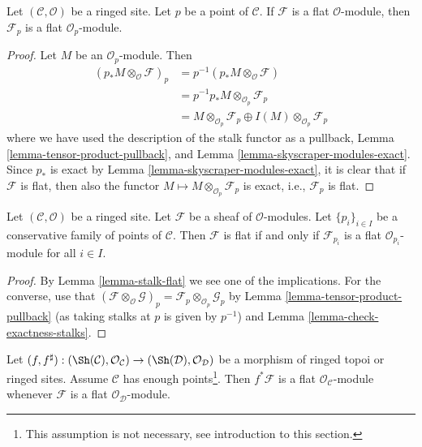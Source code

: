 \begin{lemma}
\label{lemma-stalk-flat}
Let $(\mathcal{C}, \mathcal{O})$ be a ringed site.
Let $p$ be a point of $\mathcal{C}$.
If $\mathcal{F}$ is a flat $\mathcal{O}$-module, then
$\mathcal{F}_p$ is a flat $\mathcal{O}_p$-module.
\end{lemma}

\begin{proof}
Let $M$ be an $\mathcal{O}_p$-module. Then
\begin{align*}
(p_*M \otimes_\mathcal{O} \mathcal{F})_p & =
p^{-1}(p_*M \otimes_\mathcal{O} \mathcal{F}) \\
& = p^{-1}p_*M \otimes_{\mathcal{O}_p} \mathcal{F}_p \\
& = M \otimes_{\mathcal{O}_p} \mathcal{F}_p \oplus
I(M) \otimes_{\mathcal{O}_p} \mathcal{F}_p
\end{align*}
where we have used the description of the stalk functor as a pullback,
Lemma \ref{lemma-tensor-product-pullback}, and
Lemma \ref{lemma-skyscraper-modules-exact}.
Since $p_*$ is exact by
Lemma \ref{lemma-skyscraper-modules-exact},
it is clear that if $\mathcal{F}$ is flat, then
also the functor $M \mapsto M \otimes_{\mathcal{O}_p} \mathcal{F}_p$
is exact, i.e., $\mathcal{F}_p$ is flat.
\end{proof}

\begin{lemma}
\label{lemma-check-flat-stalks}
Let $(\mathcal{C}, \mathcal{O})$ be a ringed site.
Let $\mathcal{F}$ be a sheaf of $\mathcal{O}$-modules.
Let $\{p_i\}_{i \in I}$ be a conservative family of points of $\mathcal{C}$.
Then $\mathcal{F}$ is flat if and only if $\mathcal{F}_{p_i}$ is
a flat $\mathcal{O}_{p_i}$-module for all $i \in I$.
\end{lemma}

\begin{proof}
By
Lemma \ref{lemma-stalk-flat}
we see one of the implications.
For the converse, use that
$(\mathcal{F} \otimes_\mathcal{O} \mathcal{G})_p =
\mathcal{F}_p \otimes_{\mathcal{O}_p} \mathcal{G}_p$
by
Lemma \ref{lemma-tensor-product-pullback} (as taking stalks at $p$
is given by $p^{-1}$) and
Lemma \ref{lemma-check-exactness-stalks}.
\end{proof}

\begin{lemma}
\label{lemma-pullback-flat}
Let
$(f, f^\sharp) :
(\Sh(\mathcal{C}), \mathcal{O}_\mathcal{C})
\to
(\Sh(\mathcal{D}), \mathcal{O}_\mathcal{D})$
be a morphism of ringed topoi or ringed sites.
Assume $\mathcal{C}$ has enough points\footnote{This assumption is
not necessary, see introduction to this section.}.
Then $f^*\mathcal{F}$ is a flat $\mathcal{O}_\mathcal{C}$-module
whenever $\mathcal{F}$ is a flat $\mathcal{O}_\mathcal{D}$-module.
\end{lemma}

